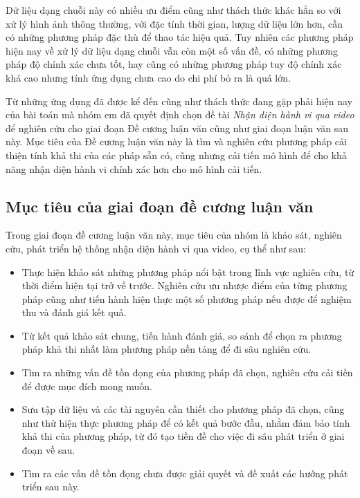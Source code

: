 Dữ liệu dạng chuỗi này có nhiều ưu điểm cũng như thách thức khác hẳn so với xử lý hình ảnh thông thường, với đặc tính thời gian, lượng dữ liệu lớn hơn,
cần có những phương pháp đặc thù để thao tác hiệu quả. Tuy nhiên các phương pháp hiện nay về xử lý dữ liệu dạng chuỗi vẫn còn một số vấn đề,
có những phương pháp độ chính xác chưa tốt, hay cũng có những phương pháp tuy độ chính xác khá cao nhưng tính ứng dụng chưa cao do chi phí bỏ ra là quá lớn.

Từ những ứng dụng đã được kể  đến cũng như thách thức đang gặp phải hiện nay của bài toán mà nhóm em đã quyết định chọn đề tài
\textit{Nhận diện hành vi qua video} để nghiên cứu cho giai đoạn Đề cương luận văn cũng như giai đoạn luận văn sau này.
Mục tiêu của Đề cương luận văn này là tìm và nghiên cứu phương pháp cải thiện tính khả thi của các pháp sẵn có, cũng nhưng cải tiến mô hình để cho khả năng
nhận diện hành vi chính xác hơn cho mô hình cải tiến.




\subsection{Mục tiêu của giai đoạn đề cương luận văn}
Trong giai đoạn đề cương luận văn này, mục tiêu của nhóm là khảo sát, nghiên cứu, phát triển hệ thống nhận diện hành vi qua video,
cụ thể  như sau:
\begin{itemize}
    \item Thực hiện khảo sát những phương pháp nổi bật trong lĩnh vực nghiên cứu, từ thời điểm hiện tại trở về trước. Nghiên
          cứu ưu nhược điểm của từng phương pháp cũng như tiến hành hiện thực một số phương pháp nếu được để nghiệm thu và đánh giá kết quả.
    \item Từ kết quả khảo sát chung, tiến hành đánh giá, so sánh để chọn ra phương pháp khả thi nhất làm phương pháp nền tảng để đi sâu nghiên cứu.
    \item Tìm ra những vấn đề tồn đọng của phương pháp đã chọn, nghiên cứu cải tiến để được mục đích mong muốn.
    \item Sưu tập dữ liệu và các tài nguyên cần thiết cho phương pháp đã chọn, cũng như thử hiện thực phương pháp để có kết quả bước đầu,
          nhằm đảm bảo tính khả thi của phương pháp, từ đó tạo tiền đề cho việc đi sâu phát triển ở giai đoạn về sau.
    \item Tìm ra các vấn đề tồn đọng chưa được giải quyết và đề xuất các hướng phát triển sau này.
\end{itemize}

